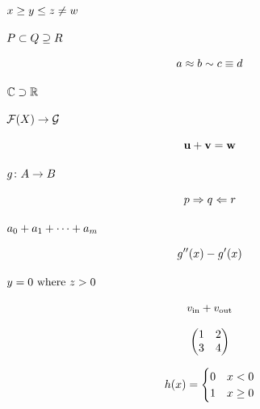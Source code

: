 \documentclass{article}
\newcommand*\pdfcraftbegin[1]{\special{pdfcraft:eq:#1:begin}}
\newcommand*\pdfcraftend[1]{\special{pdfcraft:eq:#1:end}}
\begin{document}
\par
\newpage
\setcounter{equation}{0}
$\pdfcraftbegin{ho_rel_order}
x \ge y \le z \neq w
\pdfcraftend{ho_rel_order}$
\par
\newpage
\setcounter{equation}{0}
$\pdfcraftbegin{ho_rel_sets}
P \subset Q \supseteq R
\pdfcraftend{ho_rel_sets}$
\par
\newpage
\setcounter{equation}{0}
\[\pdfcraftbegin{ho_rel_approx}
a \approx b \sim c \equiv d
\pdfcraftend{ho_rel_approx}\]
\par
\newpage
\setcounter{equation}{0}
$\pdfcraftbegin{ho_blackboard}
\mathbb{C} \supset \mathbb{R}
\pdfcraftend{ho_blackboard}$
\par
\newpage
\setcounter{equation}{0}
$\pdfcraftbegin{ho_calligraphic}
\mathcal{F}(X) \to \mathcal{G}
\pdfcraftend{ho_calligraphic}$
\par
\newpage
\setcounter{equation}{0}
\[\pdfcraftbegin{ho_bold_vec}
\mathbf{u} + \mathbf{v} = \mathbf{w}
\pdfcraftend{ho_bold_vec}\]
\par
\newpage
\setcounter{equation}{0}
$\pdfcraftbegin{ho_arrow_map}
g \colon A \to B
\pdfcraftend{ho_arrow_map}$
\par
\newpage
\setcounter{equation}{0}
\[\pdfcraftbegin{ho_arrow_impl}
p \Rightarrow q \Leftarrow r
\pdfcraftend{ho_arrow_impl}\]
\par
\newpage
\setcounter{equation}{0}
$\pdfcraftbegin{ho_dots_sum}
a_0 + a_1 + \cdots + a_m
\pdfcraftend{ho_dots_sum}$
\par
\newpage
\setcounter{equation}{0}
\[\pdfcraftbegin{ho_prime_double}
g''(x) - g'(x)
\pdfcraftend{ho_prime_double}\]
\par
\newpage
\setcounter{equation}{0}
$\pdfcraftbegin{ho_text_where}
y = 0 \text{ where } z > 0
\pdfcraftend{ho_text_where}$
\par
\newpage
\setcounter{equation}{0}
\[\pdfcraftbegin{ho_text_sub}
v_{\text{in}} + v_{\text{out}}
\pdfcraftend{ho_text_sub}\]
\par
\newpage
\setcounter{equation}{0}
\[\pdfcraftbegin{ho_pmatrix}
\begin{pmatrix} 1 & 2 \\ 3 & 4 \end{pmatrix}
\pdfcraftend{ho_pmatrix}\]
\par
\newpage
\setcounter{equation}{0}
\[\pdfcraftbegin{ho_cases_step}
h(x) = \begin{cases} 0 & x < 0 \\ 1 & x \ge 0 \end{cases}
\pdfcraftend{ho_cases_step}\]
\end{document}
